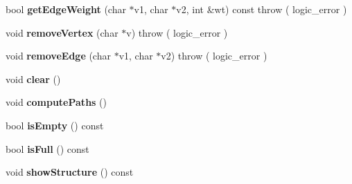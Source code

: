 \begin{DoxyCompactItemize}
\item 
\hypertarget{class_weighted_graph_a0ff5197e169472040ab88b81049340d9}{bool {\bfseries get\+Edge\+Weight} (char $\ast$v1, char $\ast$v2, int \&wt) const   throw ( logic\+\_\+error )}\label{class_weighted_graph_a0ff5197e169472040ab88b81049340d9}

\item 
\hypertarget{class_weighted_graph_a0eb59d893befdedcda67add1466b9fdd}{void {\bfseries remove\+Vertex} (char $\ast$v)  throw ( logic\+\_\+error )}\label{class_weighted_graph_a0eb59d893befdedcda67add1466b9fdd}

\item 
\hypertarget{class_weighted_graph_ad06596ac31405f02f39e482860ebe3a8}{void {\bfseries remove\+Edge} (char $\ast$v1, char $\ast$v2)  throw ( logic\+\_\+error )}\label{class_weighted_graph_ad06596ac31405f02f39e482860ebe3a8}

\item 
\hypertarget{class_weighted_graph_a26890ebf74d23821a6e4dbcf803b5002}{void {\bfseries clear} ()}\label{class_weighted_graph_a26890ebf74d23821a6e4dbcf803b5002}

\item 
\hypertarget{class_weighted_graph_aeaea1bd5b1e14b69f2155613bfd25d68}{void {\bfseries compute\+Paths} ()}\label{class_weighted_graph_aeaea1bd5b1e14b69f2155613bfd25d68}

\item 
\hypertarget{class_weighted_graph_a1c03a0f68447cf88fed97c2076501702}{bool {\bfseries is\+Empty} () const }\label{class_weighted_graph_a1c03a0f68447cf88fed97c2076501702}

\item 
\hypertarget{class_weighted_graph_a22e56836e3967031a657cfa9ea5b9843}{bool {\bfseries is\+Full} () const }\label{class_weighted_graph_a22e56836e3967031a657cfa9ea5b9843}

\item 
\hypertarget{class_weighted_graph_ad7f20a989073ea5401d504d944182347}{void {\bfseries show\+Structure} () const }\label{class_weighted_graph_ad7f20a989073ea5401d504d944182347}

\end{DoxyCompactItemize}
